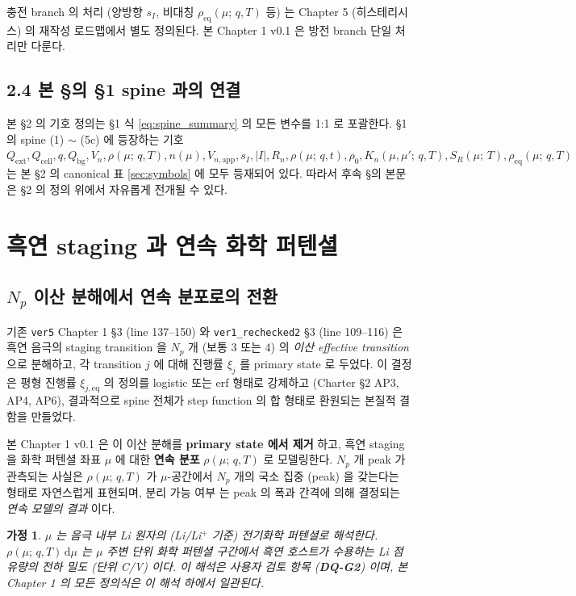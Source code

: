 \documentclass[11pt,a4paper]{article}
\newtheorem*{assumption}{가정}
\newcommand{\dd}{\mathrm{d}}
\newcommand{\app}{\mathrm{app}}
\newcommand{\eq}{\mathrm{eq}}
\newcommand{\bg}{\mathrm{bg}}
\newcommand{\cell}{\mathrm{cell}}
\newcommand{\ext}{\mathrm{ext}}
\newcommand{\mucont}{\mu}
\newcommand{\rhomu}{\rho(\mucont;\, q, T)}
\newcommand{\rhoeq}{\rho_{\eq}(\mucont;\, q, T)}
\newcommand{\rhomut}{\rho(\mucont;\, q, t)}
\newcommand{\Sreact}{S_R(\mucont;\, T)}
\newcommand{\Kncross}{K_n(\mucont, \mucont';\, q, T)}
\newcommand{\nmu}{n(\mucont)}
\begin{document}
충전 branch 의 처리 (양방향 $s_I$, 비대칭 $\rhoeq$ 등) 는 Chapter 5 (히스테리시스)
의 재작성 로드맵에서 별도 정의된다. 본 Chapter 1 v0.1 은 방전 branch 단일 처리만
다룬다.

\subsection*{2.4 본 \S 의 \S 1 spine 과의 연결}

본 \S 2 의 기호 정의는 \S 1 식 \eqref{eq:spine_summary} 의 모든 변수를 1:1 로
포괄한다. \S 1 의 spine (1) $\sim$ (5c) 에 등장하는 기호 $Q_{\ext}, Q_{\cell}, q,
Q_{\bg}, V_n, \rhomu, \nmu, V_{n,\app}, s_I, |I|, R_n, \rhomut, \rho_0, \Kncross,
\Sreact, \rhoeq$ 는 본 \S 2 의 canonical 표 \ref{sec:symbols} 에 모두 등재되어
있다. 따라서 후속 \S 의 본문은 \S 2 의 정의 위에서 자유롭게 전개될 수 있다.

\section{흑연 staging 과 연속 화학 퍼텐셜}
\label{sec:effective_transition}

\subsection{$N_p$ 이산 분해에서 연속 분포로의 전환}
\label{sec:np_to_continuous}

기존 \texttt{ver5} Chapter 1 \S 3 (line 137--150) 와 \texttt{ver1\_rechecked2}
\S 3 (line 109--116) 은 흑연 음극의 staging transition 을 $N_p$ 개 (보통 3 또는 4)
의 \emph{이산 effective transition} 으로 분해하고, 각 transition $j$ 에 대해 진행률
$\xi_j$ 를 primary state 로 두었다. 이 결정은 평형 진행률 $\xi_{j,\eq}$ 의 정의를
logistic 또는 erf 형태로 강제하고 (Charter \S 2 AP3, AP4, AP6), 결과적으로 spine
전체가 step function 의 합 형태로 환원되는 본질적 결함을 만들었다.

본 Chapter 1 v0.1 은 이 이산 분해를 \textbf{primary state 에서 제거} 하고, 흑연
staging 을 화학 퍼텐셜 좌표 $\mucont$ 에 대한 \textbf{연속 분포} $\rhomu$ 로
모델링한다. $N_p$ 개 peak 가 관측되는 사실은 $\rhomu$ 가 $\mucont$-공간에서
$N_p$ 개의 국소 집중 (peak) 을 갖는다는 형태로 자연스럽게 표현되며, 분리 가능 여부
는 peak 의 폭과 간격에 의해 결정되는 \emph{연속 모델의 결과} 이다.

\begin{assumption}
$\mucont$ 는 음극 내부 Li 원자의 (Li/Li$^+$ 기준) 전기화학 퍼텐셜로 해석한다.
$\rhomu \, \dd\mucont$ 는 $\mucont$ 주변 단위 화학 퍼텐셜 구간에서 흑연 호스트가
수용하는 Li 점유량의 전하 밀도 (단위 C/V) 이다. 이 해석은 사용자 검토 항목
(\textbf{DQ-G2}) 이며, 본 Chapter 1 의 모든 정의식은 이 해석 하에서 일관된다.
\end{assumption}
\end{document}
